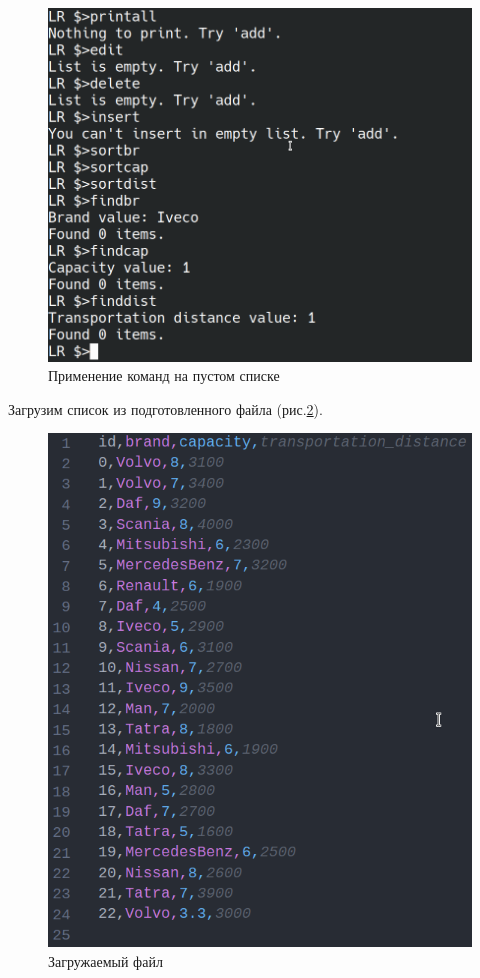\begin{figure}[H]
    \centering
    \includegraphics[width=0.9\linewidth]{photo/test.empty}
    \caption{Применение команд на пустом списке}
    \label{test.empty}
\end{figure}

Загрузим список из подготовленного файла (рис.\ref{test.bigfile1}).

\begin{figure}[H]
    \centering
    \includegraphics[width=0.9\linewidth]{photo/test.bigfile1}
    \caption{Загружаемый файл}
    \label{test.bigfile1}
\end{figure}

